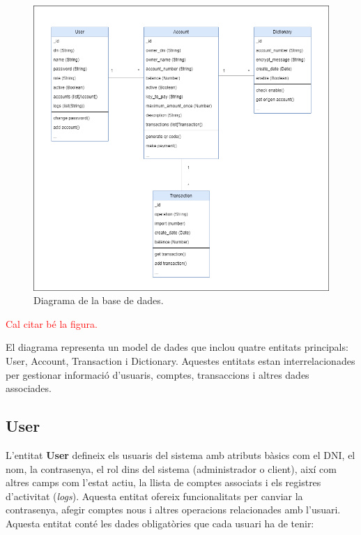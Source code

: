 \documentclass[a4paper,12pt,twoside]{ThesisStyle}
\newcommand{\pau}[1]{\textcolor{red}{#1}}
\begin{document}
\begin{figure}[h]
    \centering
    \includegraphics[width=1\textwidth]{imatges/diagrama base dades.png}
    \caption{Diagrama de la base de dades.}
    \label{fig: Diagrama de base de dades}
\end{figure}

\pau{Cal citar bé la figura.}

El diagrama representa un model de dades que inclou quatre entitats principals: User, Account, Transaction i Dictionary. Aquestes entitats estan interrelacionades per gestionar informació d'usuaris, comptes, transaccions i altres dades associades.

\subsection{User}
\label{subsec: User}


L'entitat \textbf{User} defineix els usuaris del sistema amb atributs bàsics com el DNI, el nom, la contrasenya, el rol dins del sistema (administrador o client), així com altres camps com l'estat actiu, la llista de comptes associats i els registres d'activitat (\textit{logs}). Aquesta entitat ofereix funcionalitats per canviar la contrasenya, afegir comptes nous i altres operacions relacionades amb l'usuari.\\

Aquesta entitat conté les dades obligatòries que cada usuari ha de tenir:
\end{document}
